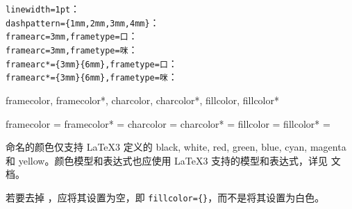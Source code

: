 \documentclass{ctxdoc}
\begin{document}
{
\verb|linewidth=1pt|： \\
\verb|dashpattern={1mm,2mm,3mm,4mm}|： \\
\verb|framearc=3mm,frametype=口|： \\
\verb|framearc=3mm,frametype=咪|： \\
\verb|framearc*={3mm}{6mm},frametype=口|： \\
\verb|framearc*={3mm}{6mm},frametype=咪|：
}

\begin{function}{
  framecolor,
  framecolor*,
  charcolor,
  charcolor*,
  fillcolor,
  fillcolor*
}
  \begin{syntax}
    framecolor  =  
    framecolor* =  
    charcolor   =  
    charcolor*  =  
    fillcolor   = 
    fillcolor*  =  
  \end{syntax}
  命名的颜色仅支持 \LaTeX3 定义的 black, white, red, green, blue, cyan, magenta 和 yellow。颜色模型和表达式也应使用 \LaTeX3 支持的模型和表达式，详见  文档。

  若要去掉 ，应将其设置为空，即 \verb|fillcolor={}|，而不是将其设置为白色。
\end{function}
\end{document}
